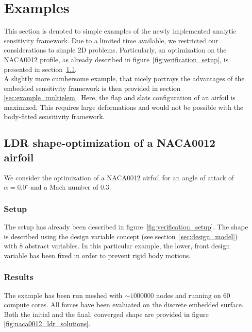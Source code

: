 \documentclass[../main.tex]{subfiles}
\begin{document}
\setlength{\delimitershortfall}{0pt}

\FloatBarrier 
\chapter{Examples}\label{sec:examples}
\minitoc


This section is denoted to simple examples of the newly implemented analytic sensitivity framework. Due to a limited time available, we restricted our considerations to simple 2D problems. Particularly, an optimization on the NACA0012 profile, as already described in figure~\ref{fig:verification_setup}, is presented in section~\ref{sec:example_naca}.\\
A slightly more cumbersome example, that nicely portrays the advantages of the embedded sensitivity framework is then provided in section \ref{sec:example_multielem}. Here, the flap and slats configuration of an airfoil is maximized. This requires large deformations and would not be possible with the body-fitted sensitivity framework.

\section{\ac{LDR} shape-optimization of a NACA0012 airfoil}\label{sec:example_naca}
We consider the optimization of a NACA0012 airfoil for an angle of attack of $\alpha=0.0^{\circ}$ and a Mach number of 0.3. %


\subsection{Setup}\label{sec:naca0012_setup}
The setup has already been described in figure~\ref{fig:verification_setup}. The shape is described using the design variable concept (see section~\ref{sec:design_model}) with $8$ abstract variables.
In this particular example, the lower, front design variable has been fixed in order to prevent rigid body motions.
\subsection{Results}\label{sec:naca0012_results}

The example has been run meshed with $\sim1000000$ nodes and running on 60 compute cores. All forces have been evaluated on the discrete embedded surface. Both the initial and the final, converged shape are provided in figure \ref{fig:naca0012_ldr_solutions}.
\end{document}
